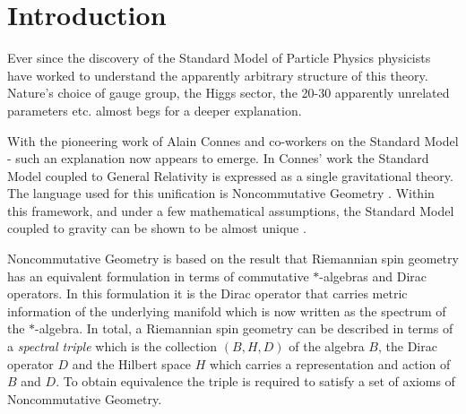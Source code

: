 \documentclass[12pt]{article}
\begin{document}
\newpage
\tableofcontents





































 




\newpage
\section{Introduction}

Ever since the discovery of the Standard Model of Particle Physics physicists have worked to understand the apparently arbitrary structure of this theory. Nature's choice of gauge group, the Higgs sector, the 20-30 apparently unrelated parameters etc. almost begs for a deeper explanation.

With the pioneering work of Alain Connes and co-workers on the Standard Model \cite{ConnesBook}-\cite{Chamseddine:2007ia} such an explanation now appears to emerge. In Connes' work the Standard Model coupled to General Relativity is expressed as a single gravitational theory. 
The language used for this unification is Noncommutative Geometry \cite{ConnesBook}.
Within this framework, and under a few mathematical assumptions, the Standard Model coupled to gravity can be shown to be almost unique \cite{Chamseddine:2007hz,Chamseddine:2007ia}.


Noncommutative Geometry is based on the result \cite{ConnesBook,Rennie:2006pi} that Riemannian spin geometry has an equivalent formulation in terms of commutative $\ast$-algebras and Dirac operators. In this formulation it is the Dirac operator that carries metric information of the underlying manifold which is now written as the spectrum of the $\ast$-algebra. In total, a Riemannian spin geometry can be described in terms of a {\it spectral triple} which is the collection $(B,H,D)$ of the algebra $B$, the Dirac operator $D$ and the Hilbert space $H$ which carries a representation and action of $B$ and $D$. To obtain equivalence the triple is required to satisfy a set of axioms of Noncommutative Geometry.
\end{document}
